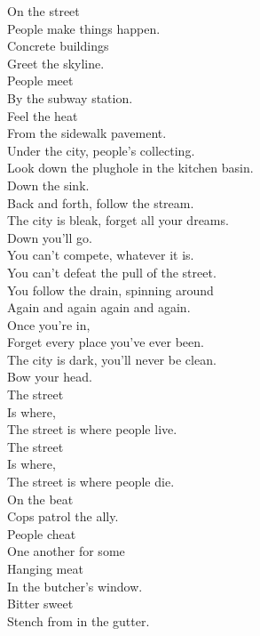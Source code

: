 



On the street \\
People make things happen. \\
Concrete buildings \\
Greet the skyline. \\
People meet \\
By the subway station. \\
Feel the heat \\
From the sidewalk pavement. \\

Under the city, people's  collecting. \\
Look down the plughole in the kitchen basin. \\

Down the sink. \\
Back and forth, follow the stream. \\
The city is bleak, forget all your dreams. \\
Down you'll go. \\
You can't compete, whatever it is. \\
You can't defeat the pull of the street. \\
You follow the drain, spinning around \\
Again and again again and again. \\
Once you're in, \\
Forget every place you've ever been. \\
The city is dark, you'll never be clean. \\
Bow your head. \\

The street \\
Is where, \\
The street is where people live. \\
The street \\
Is where, \\
The street is where people die. \\

On the beat \\
Cops patrol the ally. \\
People cheat \\
One another for some \\
Hanging meat \\
In the butcher's window. \\
Bitter sweet \\
Stench from in the gutter. \\

